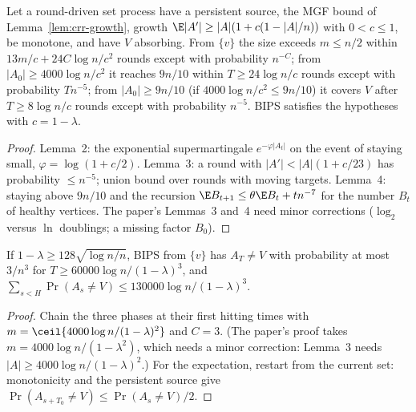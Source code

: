 \begin{theorem}\label{thm:crr-phases}
\leanok{}
Let a round-driven set process have a persistent source, the MGF bound of
Lemma~\ref{lem:crr-growth}, growth $\E|A'|\ge|A|(1+c(1-|A|/n))$ with $0<c\le1$, be monotone, and
have $V$ absorbing. From $\{v\}$ the size exceeds $m\le n/2$ within $13m/c+24C\log n/c^2$ rounds
except with probability $n^{-C}$; from $|A_0|\ge4000\log n/c^2$ it reaches $9n/10$ within
$T\ge24\log n/c$ rounds except with probability $T n^{-5}$; from $|A_0|\ge9n/10$ (if
$4000\log n/c^2\le 9n/10$) it covers $V$ after $T\ge8\log n/c$ rounds except with probability
$n^{-5}$. BIPS satisfies the hypotheses with $c=1-\lambda$.
\end{theorem}
\begin{proof}\leanok
Lemma~2: the exponential supermartingale $e^{-\varphi|A_t|}$ on the event of staying small,
$\varphi=\log(1+c/2)$. Lemma~3: a round with $|A'|<|A|(1+c/23)$ has probability $\le n^{-5}$;
union bound over rounds with moving targets. Lemma~4: staying above $9n/10$ and the recursion
$\E B_{t+1}\le\theta\E B_t+tn^{-7}$ for the number $B_t$ of healthy vertices. The paper's
Lemmas~3 and~4 need minor corrections ($\log_2$ versus $\ln$ doublings; a missing factor $B_0$).
\end{proof}

\begin{theorem}[Theorem~2]\label{thm:crr-bips}
\leanok{}
If $1-\lambda\ge128\sqrt{\log n/n}$, BIPS from $\{v\}$ has $A_T\ne V$ with probability at most
$3/n^3$ for $T\ge60000\log n/(1-\lambda)^3$, and $\sum_{s<H}\Pr(A_s\ne V)\le
130000\log n/(1-\lambda)^3$.
\end{theorem}
\begin{proof}\leanok
Chain the three phases at their first hitting times with $m=\ceil{4000\log n/(1-\lambda)^2}$ and
$C=3$. (The paper's proof takes $m=4000\log n/(1-\lambda^2)$, which needs a minor correction:
Lemma~3 needs $|A|\ge4000\log n/(1-\lambda)^2$.) For the expectation, restart from the current
set: monotonicity and the persistent source give $\Pr(A_{s+T_0}\ne V)\le\Pr(A_s\ne V)/2$.
\end{proof}

